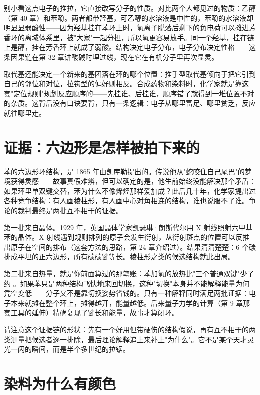 别小看这点电子的推拉，它直接改写分子的性质。对比两个人都见过的物质：乙醇（第 40 章）和苯酚。两者都带羟基，可乙醇的水溶液是中性的，苯酚的水溶液却明显显弱酸性——因为羟基挂在苯环上时，氢离子脱落后剩下的负电荷可以摊进芳香环的离域体系里，被"大家"一起分担，所以氢更容易放手。同一个羟基，挂在链上是醇，挂在芳香环上就成了弱酸。结构决定电子分布，电子分布决定性格——这条因果链在第 32 章讲酸碱时埋过线，现在它在有机分子里再次显灵。

取代基还能决定一个新来的基团落在环的哪个位置：推手型取代基倾向于把它引到自己的邻位和对位，拉钩型的偏好则相反。合成药物和染料时，化学家就是靠这套"定位规则"规划反应顺序的——先挂谁、后挂谁，顺序错了就得到一堆位置不对的杂质。这背后没有口诀要背，只有一条逻辑：电子从哪里富足、哪里贫乏，反应就往哪里走。

\section{证据：六边形是怎样被拍下来的}

\begin{zhengju}
苯的六边形环结构，是 1865 年由凯库勒提出的。传说他从"蛇咬住自己尾巴"的梦境获得灵感——故事真假难辨，但可以确定的是，他生前始终没能解决那个矛盾：如果环里单双键交替，苯为什么不像烯烃那样爱加成？此后几十年，化学家提出过各种竞争结构：有人画棱柱形，有人画中心对角相连的结构，谁也说服不了谁。争论的裁判最终是两批互不相干的证据。

第一批来自晶体。1929 年，英国晶体学家凯瑟琳·朗斯代尔用 X 射线照射六甲基苯的晶体。X 射线遇到规则排列的原子会发生衍射，从衍射斑点的位置可以反推出原子在空间的排布（这套方法的思路，第 24 章介绍过）。结果清清楚楚：6 个碳排成平坦的正六边形，所有碳碳键等长。棱柱形之类的候选结构就此出局。

第二批来自热量，就是你前面算过的那笔账：苯加氢的放热比"三个普通双键"少了约 。如果苯只是两种结构飞快地来回切换，这种"切换"本身并不能解释能量为何凭空变低——分子又不是靠切换姿势省钱的。只有一种解释同时满足两批证据：电子本来就摊在整个环上，摊得越开，能量越低。后来量子力学的计算（第 9 章那套工具的延伸）精确复现了键长和能量，故事才算闭环。

请注意这个证据链的形状：先有一个好用但带硬伤的结构假说，再有互不相干的两类测量把候选者逐一排除，最后理论解释追上来补上"为什么"。它不是某个天才灵光一闪的瞬间，而是半个多世纪的拉锯。
\end{zhengju}
\section{染料为什么有颜色}

